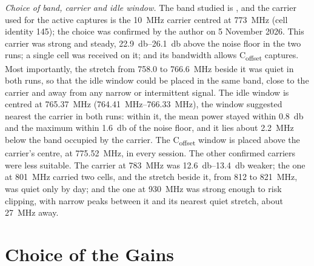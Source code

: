 \emph{Choice of band, carrier and idle window.} The band studied is \TargetBand, and the carrier used for the active captures is the \qty{10}{\mega\hertz} carrier centred at \qty{773}{\mega\hertz} (cell identity 145); the choice was confirmed by the author on 5 November 2026. This carrier was strong and steady, \qtyrange{22.9}{26.1}{\decibel} above the noise floor in the two runs; a single cell was received on it; and its bandwidth allows C\textsubscript{offset} captures. Most importantly, the stretch from 758.0 to \qty{766.6}{\mega\hertz} beside it was quiet in both runs, so that the idle window could be placed in the same band, close to the carrier and away from any narrow or intermittent signal. The idle window is centred at \qty{765.37}{\mega\hertz} (\qtyrange{764.41}{766.33}{\mega\hertz}), the window suggested nearest the carrier in both runs: within it, the mean power stayed within \qty{0.8}{\decibel} and the maximum within \qty{1.6}{\decibel} of the noise floor, and it lies about \qty{2.2}{\mega\hertz} below the band occupied by the carrier. The C\textsubscript{offset} window is placed above the carrier's centre, at \qty{775.52}{\mega\hertz}, in every session. The other confirmed carriers were less suitable. The carrier at \qty{783}{\mega\hertz} was \qtyrange{12.6}{13.4}{\decibel} weaker; the one at \qty{801}{\mega\hertz} carried two cells, and the stretch beside it, from 812 to \qty{821}{\mega\hertz}, was quiet only by day; and the one at \qty{930}{\mega\hertz} was strong enough to risk clipping, with narrow peaks between it and its nearest quiet stretch, about \qty{27}{\mega\hertz} away.

\section{Choice of the Gains}
\label{app:gains}

